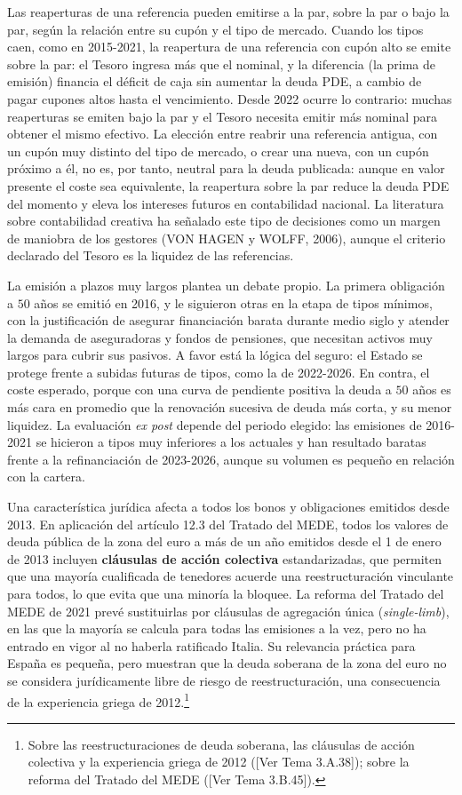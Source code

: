 \documentclass[10pt,a4paper]{article}
\newcommand{\authorfont}[1]{{\fontfamily{EBGaramond-TLF}\selectfont #1}}
\begin{document}
Las reaperturas de una referencia pueden emitirse a la par, sobre la par o bajo la par, según la relación entre su cupón y el tipo de mercado. Cuando los tipos caen, como en 2015-2021, la reapertura de una referencia con cupón alto se emite sobre la par: el Tesoro ingresa más que el nominal, y la diferencia (la prima de emisión) financia el déficit de caja sin aumentar la deuda PDE, a cambio de pagar cupones altos hasta el vencimiento. Desde 2022 ocurre lo contrario: muchas reaperturas se emiten bajo la par y el Tesoro necesita emitir más nominal para obtener el mismo efectivo. La elección entre reabrir una referencia antigua, con un cupón muy distinto del tipo de mercado, o crear una nueva, con un cupón próximo a él, no es, por tanto, neutral para la deuda publicada: aunque en valor presente el coste sea equivalente, la reapertura sobre la par reduce la deuda PDE del momento y eleva los intereses futuros en contabilidad nacional. La literatura sobre contabilidad creativa ha señalado este tipo de decisiones como un margen de maniobra de los gestores (VON HAGEN y WOLFF, 2006), aunque el criterio declarado del Tesoro es la liquidez de las referencias.

La emisión a plazos muy largos plantea un debate propio. La primera obligación a $50$ años se emitió en 2016, y le siguieron otras en la etapa de tipos mínimos, con la justificación de asegurar financiación barata durante medio siglo y atender la demanda de aseguradoras y fondos de pensiones, que necesitan activos muy largos para cubrir sus pasivos. A favor está la lógica del seguro: el Estado se protege frente a subidas futuras de tipos, como la de 2022-2026. En contra, el coste esperado, porque con una curva de pendiente positiva la deuda a $50$ años es más cara en promedio que la renovación sucesiva de deuda más corta, y su menor liquidez. La evaluación \textit{ex post} depende del periodo elegido: las emisiones de 2016-2021 se hicieron a tipos muy inferiores a los actuales y han resultado baratas frente a la refinanciación de 2023-2026, aunque su volumen es pequeño en relación con la cartera.

Una característica jurídica afecta a todos los bonos y obligaciones emitidos desde 2013. En aplicación del artículo 12.3 del Tratado del MEDE, todos los valores de deuda pública de la zona del euro a más de un año emitidos desde el 1 de enero de 2013 incluyen \textbf{cláusulas de acción colectiva} estandarizadas, que permiten que una mayoría cualificada de tenedores acuerde una reestructuración vinculante para todos, lo que evita que una minoría la bloquee. La reforma del Tratado del MEDE de 2021 prevé sustituirlas por cláusulas de agregación única (\textit{single-limb}), en las que la mayoría se calcula para todas las emisiones a la vez, pero no ha entrado en vigor al no haberla ratificado Italia. Su relevancia práctica para España es pequeña, pero muestran que la deuda soberana de la zona del euro no se considera jurídicamente libre de riesgo de reestructuración, una consecuencia de la experiencia griega de 2012.\footnote{%
    Sobre las reestructuraciones de deuda soberana, las cláusulas de acción colectiva y la experiencia griega de 2012 ([\authorfont{Ver Tema 3.A.38}]); sobre la reforma del Tratado del MEDE ([\authorfont{Ver Tema 3.B.45}]).
}
\end{document}
